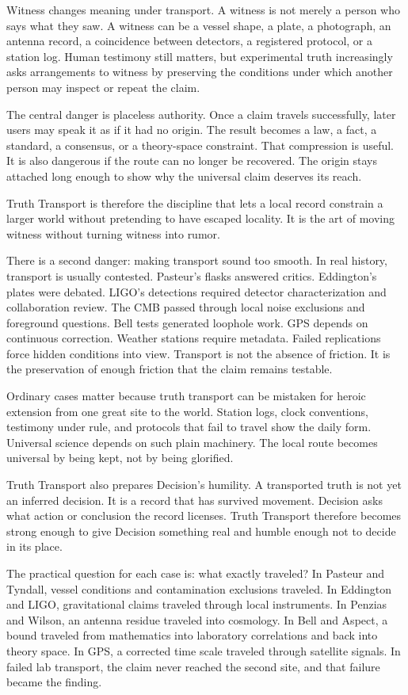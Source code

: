 \begin{chapteressay}
Witness changes meaning under transport. A witness is not merely a person who
says what they saw. A witness can be a vessel shape, a plate, a photograph,
an antenna record, a coincidence between detectors, a registered protocol, or
a station log. Human testimony still matters, but experimental truth
increasingly asks arrangements to witness by preserving the conditions under
which another person may inspect or repeat the claim.

The central danger is placeless authority. Once a claim travels successfully,
later users may speak it as if it had no origin. The result becomes a law, a
fact, a standard, a consensus, or a theory-space constraint. That compression
is useful. It is also dangerous if the route can no longer be recovered. The
origin stays attached long enough to show why the universal claim deserves its
reach.

Truth Transport is therefore the discipline that lets a local record constrain
a larger world without pretending to have escaped locality. It is the art of
moving witness without turning witness into rumor.

There is a second danger: making transport sound too smooth. In real history,
transport is usually contested. Pasteur's flasks answered critics. Eddington's
plates were debated. LIGO's detections required detector characterization and
collaboration review. The CMB passed through local noise exclusions and
foreground questions. Bell tests generated loophole work. GPS depends on
continuous correction. Weather stations require metadata. Failed replications
force hidden conditions into view. Transport is not the absence of friction.
It is the preservation of enough friction that the claim remains testable.

Ordinary cases matter because truth transport can be mistaken for heroic
extension from one great site to the world. Station logs, clock conventions,
testimony under rule, and protocols that fail to travel show the daily form.
Universal science depends on such plain machinery. The local route becomes
universal by being kept, not by being glorified.

Truth Transport also prepares Decision's humility. A transported truth is not
yet an inferred decision. It is a record that has survived movement. Decision
asks what action or conclusion the record licenses. Truth Transport therefore
becomes strong enough to give Decision something real and humble enough not to
decide in its place.

The practical question for each case is: what exactly traveled? In Pasteur
and Tyndall, vessel conditions and contamination exclusions traveled. In
Eddington and LIGO, gravitational claims traveled through local instruments.
In Penzias and Wilson, an antenna residue traveled into cosmology. In Bell and
Aspect, a bound traveled from mathematics into laboratory correlations and
back into theory space. In GPS, a corrected time scale traveled through
satellite signals. In failed lab transport, the claim never reached the second
site, and that failure became the finding.


\end{chapteressay}
